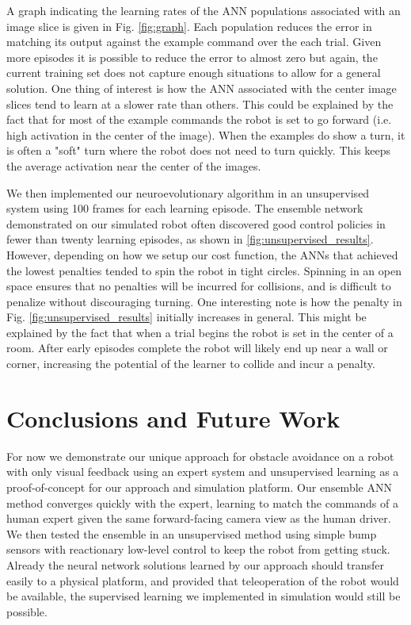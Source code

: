 \documentclass{article}
\begin{document}
		A graph indicating the learning rates of the ANN populations associated with an image slice is given in Fig. \ref{fig:graph}.  Each population reduces the error in matching its output against the example command over the each trial.  Given more episodes it is possible to reduce the error to almost zero but again, the current training set does not capture enough situations to allow for a general solution.  One thing of interest is how the ANN associated with the center image slices tend to learn at a slower rate than others.  This could be explained by the fact that for most of the example commands the robot is set to go forward (i.e. high activation in the center of the image).  When the examples do show a turn, it is often a "soft" turn where the robot does not need to turn quickly.  This keeps the average activation near the center of the images.
		
		We then implemented our neuroevolutionary algorithm in an unsupervised system using 100 frames for each learning episode. The ensemble network demonstrated on our simulated robot often discovered good control policies in fewer than twenty learning episodes, as shown in \ref{fig:unsupervised_results}.  However, depending on how we setup our cost function, the ANNs that achieved the lowest penalties tended to spin the robot in tight circles.  Spinning in an open space ensures that no penalties will be incurred for collisions, and is difficult to penalize without discouraging turning.  One interesting note is how the penalty in Fig. \ref{fig:unsupervised_results} initially increases in general.  This might be explained by the fact that when a trial begins the robot is set in the center of a room.  After early episodes complete the robot will likely end up near a wall or corner, increasing the potential of the learner to collide and incur a penalty.
	
	\section{Conclusions and Future Work}

		For now we demonstrate our unique approach for obstacle avoidance on a robot with only visual feedback using an expert system and unsupervised learning as a proof-of-concept for our approach and simulation platform.  Our ensemble ANN method converges quickly with the expert, learning to match the commands of a human expert given the same forward-facing camera view as the human driver.  We then tested the ensemble in an unsupervised method using simple bump sensors with reactionary low-level control to keep the robot from getting stuck.  Already the neural network solutions learned by our approach should transfer easily to a physical platform, and provided that teleoperation of the robot would be available, the supervised learning we implemented in simulation would still be possible.
\end{document}
